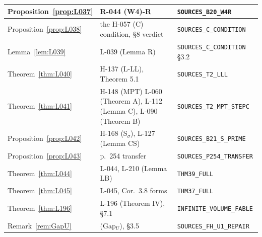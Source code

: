 \begin{longtable}{|p{4.2cm}|p{5.4cm}|p{5.4cm}|}
Proposition~\ref{prop:L037} & R-044 (W4)-R & \texttt{SOURCES\_B20\_W4R} \\ \hline
Proposition~\ref{prop:L038} & the H-057 (C) condition, \S8 verdict & \texttt{SOURCES\_C\_CONDITION} \\ \hline
Lemma~\ref{lem:L039} & L-039 (Lemma R) & \texttt{SOURCES\_C\_CONDITION} \S3.2 \\ \hline
Theorem~\ref{thm:L040} & H-137 (L-LL), Theorem 5.1 & \texttt{SOURCES\_T2\_LLL} \\ \hline
Theorem~\ref{thm:L041} & H-148 (MPT) L-060 (Theorem A), L-112 (Lemma C), L-090 (Theorem B) & \texttt{SOURCES\_T2\_MPT\_STEPC} \\ \hline
Proposition~\ref{prop:L042} & H-168 (S$_\sigma$), L-127 (Lemma CS) & \texttt{SOURCES\_B21\_S\_PRIME} \\ \hline
Proposition~\ref{prop:L043} & p.~254 transfer & \texttt{SOURCES\_P254\_TRANSFER} \\ \hline
Theorem~\ref{thm:L044} & L-044, L-210 (Lemma LB) & \texttt{THM39\_FULL} \\ \hline
Theorem~\ref{thm:L045} & L-045, Cor.\ 3.8 forms & \texttt{THM37\_FULL} \\ \hline
Theorem~\ref{thm:L196} & L-196 (Theorem IV), \S7.1 & \texttt{INFINITE\_VOLUME\_FABLE} \\ \hline
Remark~\ref{rem:GapU} & (Gap$_U$), \S3.5 & \texttt{SOURCES\_FH\_U1\_REPAIR} \\ \hline
\end{longtable}
